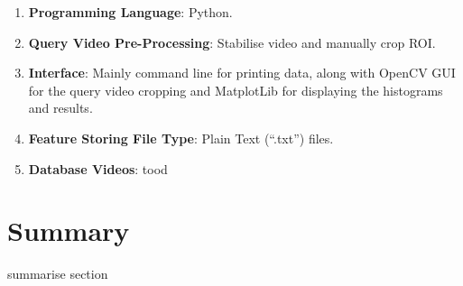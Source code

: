 \begin{enumerate}
    \item \textbf{Programming Language}: Python.
    \item \textbf{Query Video Pre-Processing}: Stabilise video and manually crop ROI.
    \item \textbf{Interface}: Mainly command line for printing data, along with OpenCV GUI for the query video cropping and MatplotLib for displaying the histograms and results.
    \item \textbf{Feature Storing File Type}: Plain Text (``.txt'') files.
    \item \textbf{Database Videos}: tood
\end{enumerate}

\section{Summary}

summarise section
